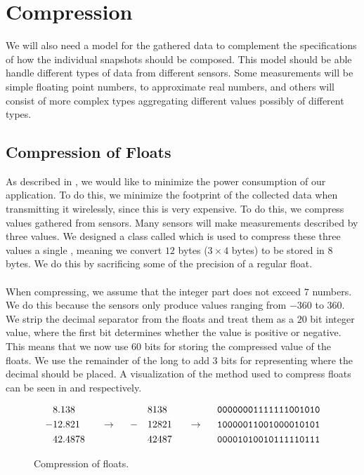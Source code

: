 
\section{Compression}
We will also need a model for the gathered data to complement the specifications of how the individual snapshots should be composed. This model should be able handle different types of data from different sensors. Some measurements will be simple floating point numbers, to approximate real numbers, and others will consist of more complex types aggregating different values possibly of different types.



\subsection{Compression of Floats}
As described in , we would like to minimize the power consumption of our application. To do this, we minimize the footprint of the collected data when transmitting it wirelessly, since this is very expensive. To do this, we compress values gathered from sensors. Many sensors will make measurements described by three  values. We designed a class called  which is used to compress these three values a single , meaning we convert $12$ bytes ($3 \times 4$ bytes) to be stored in $8$ bytes. We do this by sacrificing some of the precision of a regular float.
\\\\
When compressing, we assume that the integer part does not exceed $7$ numbers. We do this because the sensors only produce values ranging from $-360$ to $360$. We strip the decimal separator from the floats and treat them as a $20$ bit integer value, where the first bit determines whether the value is positive or negative. This means that we now use $60$ bits for storing the compressed value of the floats. We use the remainder of the long to add 3 bits for representing where the decimal should be placed. A visualization of the method used to compress floats can be seen in  and  respectively.
\begin{figure}[!htbp]
    \begin{alignat*}{6}
       &8.138   &&                   &&   && 8138  &&                   && \text{\texttt{00000001111111001010}} \\
      -&12.821  && ~~ \rightarrow ~~ && - && 12821 && ~~ \rightarrow ~~ && \text{\texttt{10000011001000010101}} \\
       &42.4878 &&                   &&   && 42487 &&                   && \text{\texttt{00001010010111110111}} 
    \end{alignat*}
    \caption{Compression of floats.}
    \label{fig:float_triple_convert}
\end{figure}

